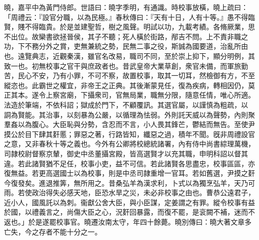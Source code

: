 \begin{pinyinscope}
曉，嘉平中為黃門侍郎。世語曰：曉字季明，有通識。時校事放橫，曉上疏曰：「周禮云：『設官分職，以為民極。』春秋傳曰：『天有十日，人有十等。』愚不得臨賢，賤不得臨貴。於是並建聖哲，樹之風聲。明試以功，九載考績。各脩厥業，思不出位。故欒書欲拯晉侯，其子不聽；死人橫於街路，邴吉不問。上不責非職之功，下不務分外之賞，吏無兼統之勢，民無二事之役，斯誠為國要道，治亂所由也。遠覽典志，近觀秦漢，雖官名改易，職司不同，至於崇上抑下，顯分明例，其致一也。初無校事之官干與庶政者也。昔武皇帝大業草創，衆官未備，而軍旅勤苦，民心不安，乃有小罪，不可不察，故置校事，取其一切耳，然檢御有方，不至縱恣也。此霸世之權宜，非帝王之正典。其後漸蒙見任，復為疾病，轉相因仍，莫正其本。遂令上察宮廟，下攝衆司，官無局業，職無分限，隨意任情，唯心所適。法造於筆端，不依科詔；獄成於門下，不顧覆訊。其選官屬，以謹慎為粗疏，以𧩪詷為賢能。其治事，以刻暴為公嚴，以循理為怯弱。外則託天威以為聲勢，內則聚羣姦以為腹心。大臣恥與分勢，含忍而不言，小人畏其鋒芒，鬱結而無告。至使尹摸公於目下肆其姧慝；罪惡之著，行路皆知，纖惡之過，積年不聞。旣非周禮設官之意，又非春秋十等之義也。今外有公卿將校總統諸署，內有侍中尚書綜理萬機，司隷校尉督察京輦，御史中丞董攝宮殿，皆高選賢才以充其職，申明科詔以督其違。若此諸賢猶不足任，校事小吏，益不可信。若此諸賢各思盡忠，校事區區，亦復無益。若更高選國士以為校事，則是中丞司隷重增一官耳。若如舊選，尹摸之姧今復發矣。進退推筭，無所用之。昔桑弘羊為漢求利，卜式以為獨烹弘羊，天乃可雨。若使政治得失必感天地，臣恐水旱之災，未必非校事之由也。曹恭公遠君子，近小人，國風託以為刺。衞獻公舍大臣，與小臣謀，定姜謂之有罪。縱令校事有益於國，以禮義言之，尚傷大臣之心，況姧回暴露，而復不罷，是衮闕不補，迷而不返也。」於是遂罷校事官。曉遷汝南太守，年四十餘薨。曉別傳曰：曉大著文章多亡失，今之存者不能十分之一。


\end{pinyinscope}